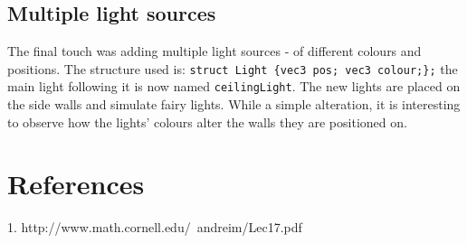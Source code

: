 \documentclass[DIV=calc, paper=a4, fontsize=11pt, twocolumn]{article}	 %
\begin{document}
	\vspace{5cm} %
	\subsection*{Multiple light sources}
	The final touch was adding multiple light sources - of different colours and positions. The structure used is: \texttt{struct Light \{vec3 pos; vec3 colour;\};} the main light following it is now named \texttt{ceilingLight}. The new lights are placed on the side walls and simulate fairy lights. While a simple alteration, it is interesting to observe how the lights' colours alter the walls they are positioned on.
	

	\section*{References}
	1. http://www.math.cornell.edu/~andreim/Lec17.pdf
\end{document}
